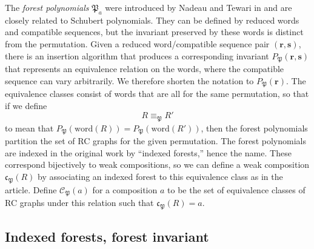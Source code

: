 \documentclass[a4paper,fleqn]{cas-sc}
\theoremstyle{definition}
\theoremstyle{remark}
\numberwithin{equation}{subsection}
\newcommand{\forest}{\mathfrak{P}}
\newcommand{\fcode}{\mathfrak{c}_\forest}
\newcommand{\finv}{P_{\forest}}
\begin{document}
The \emph{forest polynomials} $\forest_a$ were introduced by Nadeau and Tewari in \cite{nadeau2024forest} and are closely related to Schubert polynomials. They can be defined by reduced words and compatible sequences, but the invariant preserved by these words is distinct from the permutation. Given a reduced word/compatible sequence pair $(\mathbf{r},\mathbf{s})$, there is an insertion algorithm that produces a corresponding invariant $\finv(\mathbf{r},\mathbf{s})$ that represents an equivalence relation on the words, where the compatible sequence can vary arbitrarily. We therefore shorten the notation to $\finv(\mathbf{r})$. The equivalence classes consist of words that are all for the same permutation, so that if we define
$$R\equiv_{\forest} R'$$
to mean that $\finv(\mathrm{word}(R)) = \finv(\mathrm{word}(R'))$, then the forest polynomials partition the set of RC graphs for the given permutation. The forest polynomials are indexed in the original work by ``indexed forests,'' hence the name. These correspond bijectively to weak compositions, so we can define a weak composition $\fcode(R)$ by associating an indexed forest to this equivalence class as in the article. Define $\mathcal{C}_\forest(a)$ for a composition $a$ to be the set of equivalence classes of RC graphs under this relation such that $\fcode(R)=a$.


\subsection{Indexed forests, forest invariant}
\end{document}
